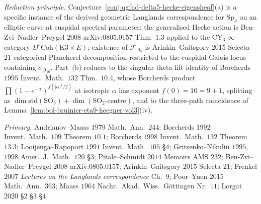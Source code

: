 \emph{Reduction principle.}
Conjecture~\ref{conj:qgfnd-delta5-hecke-eigensheaf}(a) is a specific
instance of the derived geometric Langlands correspondence for
$\mathrm{Sp}_4$ on an elliptic curve at cuspidal spectral parameter:
the generalised Hecke action is Ben-Zvi--Nadler--Preygel $2008$
arXiv:$0805.0157$ Thm.~$1.3$ applied to the $\mathrm{CY}_3$
$\infty$-category $D^b\mathrm{Coh}(\mathrm{K3}\times E)$; existence
of $\mathcal F_{\Delta_5}$ is Arinkin--Gaitsgory $2015$ Selecta $21$
categorical Plancherel decomposition restricted to the
cuspidal-Galois locus containing $\sigma_{\Delta_{10}}$. Part~(b)
reduces to the singular-theta lift identity of Borcherds $1995$
Invent.\ Math.\ $132$ Thm.~$10.4$, whose Borcherds product
$\prod(1-e^{-\alpha})^{f(|\alpha|^2/2)}$ at isotropic $\alpha$ has
exponent $f(0)=10=9+1$, splitting as
$\dim\mathrm{std}(\mathrm{SO}_5)+\dim(\mathrm{SO}_2\text{-centre})$,
and to the three-path coincidence of
Lemma~\ref{lem:bol-bruinier-eta9-heegner-vol3}(iv).

\emph{Primary.}
Andrianov--Maass $1979$ Math.\ Ann.\ $244$;
Borcherds $1992$ Invent.\ Math.\ $109$ Theorem $10.1$;
Borcherds $1998$ Invent.\ Math.\ $132$ Theorem~$13.3$;
Looijenga--Rapoport $1991$ Invent.\ Math.\ $105$ \S$4$;
Gritsenko--Nikulin $1995$, $1998$ Amer.\ J.\ Math.\ $120$ \S$3$;
Pitale--Schmidt $2014$ Memoirs AMS $232$;
Ben-Zvi--Nadler--Preygel $2008$ arXiv:$0805.0157$;
Arinkin--Gaitsgory $2015$ Selecta $21$;
Frenkel $2007$ \emph{Lectures on the Langlands correspondence} Ch.~$9$;
Poor--Yuen $2015$ Math.\ Ann.\ $363$;
Maass $1964$ Nachr.\ Akad.\ Wiss.\ G\"ottingen Nr.\ $11$;
Lorgat $2020$ \S$2$ \S$3$ \S$4$.

